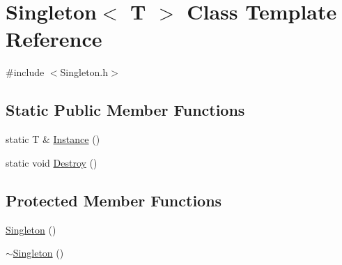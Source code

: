 \hypertarget{class_singleton}{\section{Singleton$<$ T $>$ Class Template Reference}
\label{class_singleton}
}


{\ttfamily \#include $<$Singleton.\+h$>$}

\subsection*{Static Public Member Functions}
\begin{DoxyCompactItemize}
\item 
static T \& \hyperlink{class_singleton_a131e87528259529400d58b6df5d9743c}{Instance} ()
\item 
static void \hyperlink{class_singleton_a7058846441886b854787967b56c088dc}{Destroy} ()
\end{DoxyCompactItemize}
\subsection*{Protected Member Functions}
\begin{DoxyCompactItemize}
\item 
\hyperlink{class_singleton_a923b995920da9c06590adb170ab2f890}{Singleton} ()
\item 
\hyperlink{class_singleton_ac6e7af82cba33f561bd64e5e0243e7f8}{$\sim$\+Singleton} ()
\end{DoxyCompactItemize}


